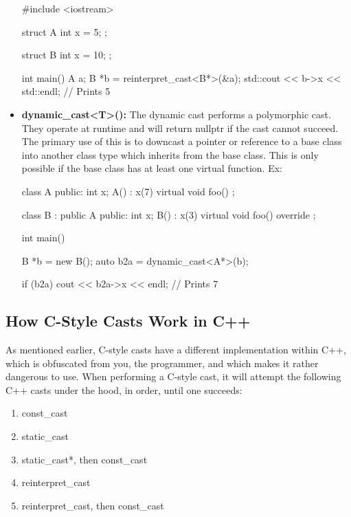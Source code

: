 \documentclass{article}
\begin{document}
\begin{itemize}
{    \begin{cpplst}

    #include <iostream>

    struct A
    {
        int x = 5;
    };

    struct B
    {
        int x = 10;
    };

    int main()
    {
        A a;
        B *b = reinterpret_cast<B*>(&a);
        std::cout << b->x << std::endl; // Prints 5
    }

    \end{cpplst}
}

\item{%
    \textbf{dynamic\_cast<T>():} The dynamic cast performs a polymorphic cast. They operate at runtime and
    will return nullptr if the cast cannot succeed. The primary use of this is to downcast a pointer or
    reference to a base class into another class type which inherits from the base class. This is only
    possible if the base class has at least one virtual function. Ex:

    \begin{cpplst}

    class A
    {
    public:
        int x;
        A() : x(7) {}
        virtual void foo() {}
    };

    class B : public A
    {
    public:
        int x;
        B() : x(3) {}
        virtual void foo() override {}
    };

    int main()
    {
        B *b = new B();
        auto b2a = dynamic_cast<A*>(b);

        if (b2a)
        {
            cout << b2a->x << endl; // Prints 7
        }
    }

    \end{cpplst}
}

\end{itemize}

\subsection{How C-Style Casts Work in C++}

As mentioned earlier, C-style casts have a different implementation within C++, which is obfuscated from you,
the programmer, and which makes it rather dangerous to use. When performing a C-style cast, it will attempt
the following C++ casts under the hood, in order, until one succeeds:

\begin{enumerate}

\item const\_cast

\item static\_cast

\item static\_cast*, then const\_cast

\item reinterpret\_cast

\item reinterpret\_cast, then const\_cast

\end{enumerate}
\end{document}
